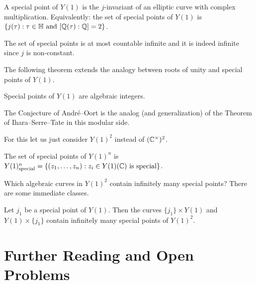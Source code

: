 \begin{definition}
  A special point of $Y(1)$ is the $j$-invariant of an elliptic curve
  with complex multiplication. Equivalently: the set of special points
  of $Y(1)$ is $\{j(\tau) : \tau\in{\mathbb{H}} \text{ and }[{\mathbb{Q}}(\tau):{\mathbb{Q}}]=2\}$. 
\end{definition}

The set of special points is at most countable infinite and it is
indeed infinite since $j$ is non-constant.

The following theorem  extends
the analogy between roots of unity and special points of $Y(1)$.
\begin{theorem}
  Special points  of $Y(1)$ are algebraic integers. 
\end{theorem}

The Conjecture of Andr\'e--Oort is the analog (and generalization) of
the Theorem of Ihara--Serre--Tate in this modular side.

For this let us just consider $Y(1)^2$ instead of $({\mathbb{C}}^\times)^2$.
\begin{definition}
  The set of special points of  $Y(1)^n$ is $Y(1)^n_{\mathrm{special}}=\{(z_1,\ldots,z_n) :
  z_i\in Y(1)({\mathbb{C}})\text{ is special} \}$. 
\end{definition}

Which algebraic curves in $Y(1)^2$ contain infinitely many special
points? There are some immediate classes.

\begin{example}
  Let $j_1$ be a special point of $Y(1)$.  Then the curves
  $\{j_1\}\times Y(1)$ and $Y(1)\times \{j_1\}$ contain infinitely many
  special points of $Y(1)^2$. 
\end{example}

\section{Further Reading and Open Problems}


